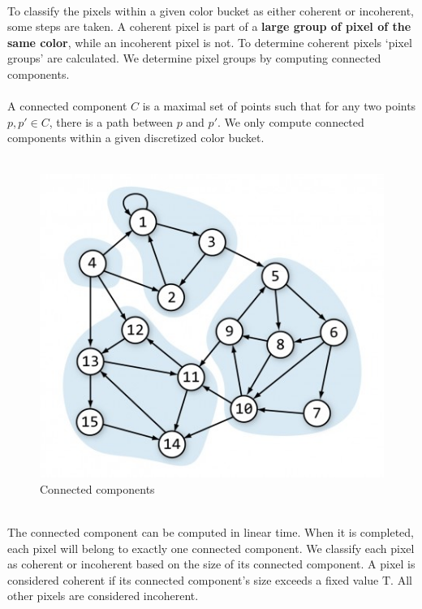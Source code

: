 \documentclass[pstricks,10pt,notitlepage]{report}
\begin{document}
\\
To classify the pixels within a given color bucket as either coherent or incoherent, some steps are taken. A coherent pixel is part of a \textbf{large group of pixel of the same color}, while an incoherent pixel is not. To determine coherent pixels ‘pixel groups’ are calculated. We determine pixel groups by computing connected components.\\
\\
A connected component $C$ is a maximal set of points such that for any two points $p,p' \in C$, there is a path between $p$ and $p'$. We only compute connected components within a given discretized color bucket.\\
\\
\begin{figure}[!h]
\centering
        \includegraphics[width=.4\linewidth]{connected.jpg}
    \caption{Connected components}
    \label{fig:connected}
\end{figure}
\\
The connected component can be computed in linear time. When it is completed, each pixel will belong to exactly one connected component. We classify each pixel as coherent or incoherent based on the size of its connected component. A pixel is considered coherent if its connected component’s size exceeds a fixed value $\mathrm{T}$. All other pixels are considered incoherent.\\
\end{document}

